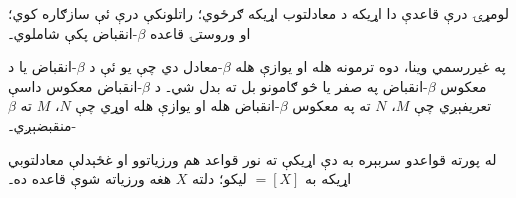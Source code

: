 \documentclass[../../../include/open-logic-section]{subfiles}
\begin{document}
لومړۍ درې قاعدې دا اړيکه د معادلتوب اړيکه ګرځوي؛
راتلونکې درې ئې سازګاره کوي؛ او وروستۍ قاعده
$\beta$-انقباض پکې شاملوي۔

په غيررسمي وينا، دوه ترمونه هله او يوازې هله
$\beta$-معادل دي چې يو ئې د $\beta$-انقباض يا د
معکوس $\beta$-انقباض په صفر يا څو ګامونو بل ته بدل شي۔
د $\beta$-انقباض معکوس داسې تعريفېږي چې $M$،
$N$ ته په معکوس $\beta$-انقباض هله او يوازې هله
اوړي چې $N$، $M$ ته $\beta$-منقبضېږي۔

له پورته قواعدو سربېره به دې اړيکې ته نور قواعد
هم ورزياتوو او غځېدلې معادلتوبي اړيکه به
$\equal[X]$ ليکو؛ دلته $X$ هغه ورزياته شوې قاعده ده۔
\end{document}
